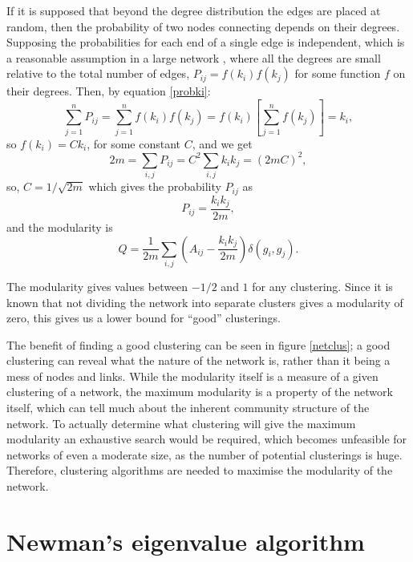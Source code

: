 If it is supposed that beyond the degree distribution the edges are placed at random, 
then the probability of two nodes connecting depends on their 
degrees. Supposing the probabilities for each end of a single edge is independent, which is a reasonable assumption in a large network \citep{Newman2010a}, where all the degrees are small 
relative to the total number of edges, $P_{ij} = f(k_i)f(k_j)$ for 
some function $f$ on their degrees.  Then, by equation \ref{probki}:
\begin{equation}
\sum_{j=1}^{n}P_{ij} = \sum_{j=1}^n f(k_i)f(k_j) = f(k_i)\left[\sum_{j=1}^n f(k_j)\right]=k_i,
\end{equation}
so $f(k_i) = Ck_i$, for some constant $C$, and we get
\begin{equation}
2m = \sum_{i,j}P_{ij} = C^2\sum_{i,j}k_ik_j = (2mC)^2,
\end{equation}
so, $C = 1/\sqrt{2m}$ which gives the probability $P_{ij}$ as
\begin{equation}
P_{ij} = \frac{k_i k_j}{2m},
\end{equation}
and the modularity is
\begin{equation}\label{NewMod}
Q= \frac{1}{2m}\sum_{i,j} \left(A_{ij} -
\frac{k_ik_j}{2m}\right)\delta(g_i,g_j).
\end{equation}

The modularity gives values between $-1/2$ and $1$ for any clustering.  Since it is known that not 
dividing the network into separate clusters gives a modularity of zero, this 
gives us a lower bound for ``good'' clusterings.

The benefit of finding a good clustering can be seen in figure \ref{netclus}; 
a good clustering can reveal what the nature of the network is, rather than it 
being a mess of nodes and links.  While the modularity itself is a measure of a 
given clustering of a network, the maximum modularity is a property of the 
network itself, which can tell much about the inherent community structure of the 
network. To actually determine what clustering will give the maximum modularity an exhaustive search would be required, which becomes unfeasible for networks of even  a moderate size, as the number of potential clusterings is huge. Therefore, clustering algorithms are needed to 
maximise the modularity of the network.

\section{Newman's eigenvalue algorithm}

